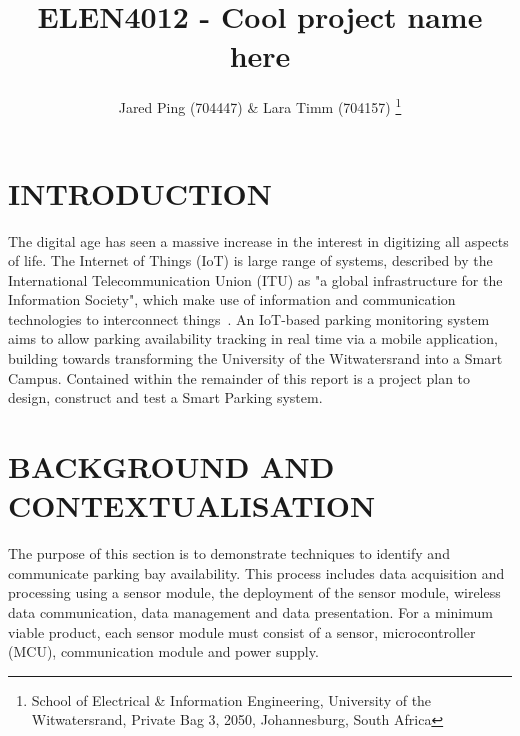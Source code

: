 \documentclass[10pt,twocolumn]{witseiepaper}
\begin{document}
	
	
\title{ELEN4012 - Cool project name here}
	
\author{Jared Ping (704447) \& Lara Timm (704157)
	\thanks{School of Electrical \& Information Engineering, University of the
			Witwatersrand, Private Bag 3, 2050, Johannesburg, South Africa}
}
	
\abstract{}
	
\keywords{}
	
\maketitle
\section{INTRODUCTION}


The digital age has seen a massive increase in the interest in digitizing all aspects of life. The Internet of Things (IoT) is large range of systems, described by the International Telecommunication Union (ITU) as "a global infrastructure for the Information Society", which make use of information and communication technologies to interconnect things~\cite{wortmann_internet_2015}. An IoT-based parking monitoring system aims to allow parking availability tracking in real time via a mobile application, building towards transforming the University of the Witwatersrand into a  Smart Campus. Contained within the remainder of this report is a project plan to design, construct and test a Smart Parking system.

\vspace{1em}
\section{BACKGROUND AND CONTEXTUALISATION}
	The purpose of this section is to demonstrate techniques to identify and communicate parking bay availability. This process includes data acquisition and processing using a sensor module, the deployment of the sensor module, wireless data communication, data management and data presentation. For a minimum viable product, each sensor module must consist of a sensor, microcontroller (MCU), communication module and power supply.
\end{document}
